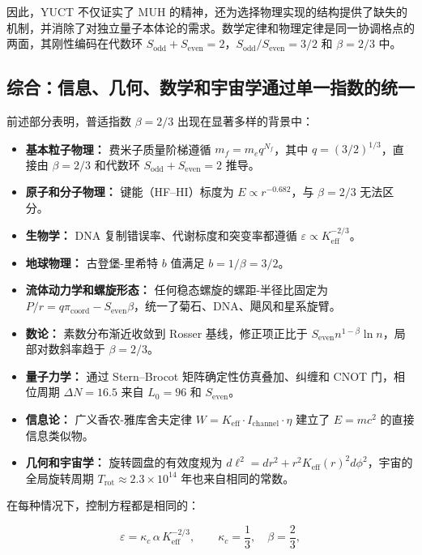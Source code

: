\documentclass[12pt]{article}
\newcommand{\Sodd}{S_{\mathrm{odd}}}
\newcommand{\Seven}{S_{\mathrm{even}}}
\begin{document}
	因此，YUCT 不仅证实了 MUH 的精神，还为选择物理实现的结构提供了缺失的机制，并消除了对独立量子本体论的需求。数学定律和物理定律是同一协调格点的两面，其刚性编码在代数环 \(\Sodd + \Seven = 2\)，\(\Sodd/\Seven = 3/2\) 和 \(\beta = 2/3\) 中。
	
	\subsection{综合：信息、几何、数学和宇宙学通过单一指数的统一}
	
	前述部分表明，普适指数 \(\beta = 2/3\) 出现在显著多样的背景中：
	
	\begin{itemize}
		\item \textbf{基本粒子物理：} 费米子质量阶梯遵循 \(m_f = m_e q^{N_f}\)，其中 \(q = (3/2)^{1/3}\)，直接由 \(\beta = 2/3\) 和代数环 \(S_{\mathrm{odd}}+S_{\mathrm{even}}=2\) 推导。
		\item \textbf{原子和分子物理：} 键能（HF–HI）标度为 \(E \propto r^{-0.682}\)，与 \(\beta = 2/3\) 无法区分。
		\item \textbf{生物学：} DNA 复制错误率、代谢标度和突变率都遵循 \(\varepsilon \propto K_{\mathrm{eff}}^{-2/3}\)。
		\item \textbf{地球物理：} 古登堡-里希特 \(b\) 值满足 \(b = 1/\beta = 3/2\)。
		\item \textbf{流体动力学和螺旋形态：} 任何稳态螺旋的螺距-半径比固定为 \(P/r = q \pi_{\mathrm{coord}} - S_{\mathrm{even}}\beta\)，统一了菊石、DNA、飓风和星系旋臂。
		\item \textbf{数论：} 素数分布渐近收敛到 Rosser 基线，修正项正比于 \(\Seven n^{1-\beta}\ln n\)，局部对数斜率趋于 \(\beta = 2/3\)。
		\item \textbf{量子力学：} 通过 Stern–Brocot 矩阵确定性仿真叠加、纠缠和 CNOT 门，相位周期 \(\Delta N = 16.5\) 来自 \(L_0=96\) 和 \(\Seven\)。
		\item \textbf{信息论：} 广义香农-雅库舍夫定律 \(W = K_{\mathrm{eff}} \cdot I_{\mathrm{channel}} \cdot \eta\) 建立了 \(E = mc^2\) 的直接信息类似物。
		\item \textbf{几何和宇宙学：} 旋转圆盘的有效度规为 \(d\ell^2 = dr^2 + r^2 K_{\mathrm{eff}}(r)^2 d\phi^2\)，宇宙的全局旋转周期 \(T_{\mathrm{rot}} \approx 2.3\times10^{14}\) 年也来自相同的常数。
	\end{itemize}
	
	在每种情况下，控制方程都是相同的：
	
	\begin{equation}
		\boxed{ \varepsilon = \kappa_c \, \alpha \, K_{\mathrm{eff}}^{-2/3} },
		\qquad \kappa_c = \frac{1}{3},\quad \beta = \frac{2}{3},
	\end{equation}
	
\end{document}

